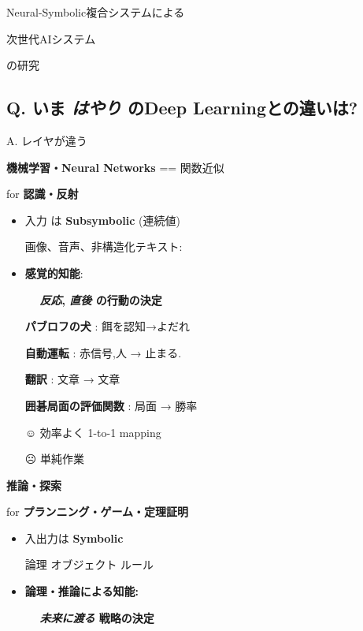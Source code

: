\begin{xlarge}
Neural-Symbolic複合システムによる
\begin{center}
次世代AIシステム
\end{center}
\begin{alignright}
の研究
\end{alignright}
\end{xlarge}

\subsection{Q. いま \textbf{\emph{はやり}} のDeep Learningとの違いは?}
\label{sec-2-1}

A. レイヤが違う

\begin{container-fluid}
\begin{row-fluid}
\begin{span6}
\textbf{機械学習・Neural Networks} == 関数近似

for \textbf{認識・反射}
\begin{itemize}
\item 入力 は \textbf{Subsymbolic} (連続値)

画像、音声、非構造化テキスト:
\item \textbf{感覚的知能}:

　 \textbf{\emph{反応}, \emph{直後} の行動の決定}
\begin{smaller}
\textbf{パブロフの犬} : 餌を認知→よだれ

\textbf{自動運転} : 赤信号,人 → 止まる.

\textbf{翻訳} : 文章 → 文章

\textbf{囲碁局面の評価関数} : 局面 → 勝率
\end{smaller}
\begin{larger}
☺ 効率よく 1-to-1 mapping

☹ 単純作業
\end{larger}
\end{itemize}
\end{span6}
\begin{span6}
\textbf{推論・探索}

for \textbf{プランニング・ゲーム・定理証明}
\begin{itemize}
\item 入出力は \textbf{Symbolic}

論理 オブジェクト ルール
\item \textbf{論理・推論による知能:}

　 \textbf{\emph{未来に渡る} 戦略の決定}


\end{itemize}
\end{span6}
\end{row-fluid}
\end{container-fluid}
